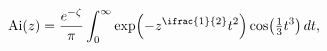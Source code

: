 \[\mathop{\mathrm{Ai}\/}\nolimits\!\left(z\right)=\frac{e^{-\zeta}}{\pi}\int_{0}%
^{\infty}\mathop{\exp\/}\nolimits\!\left(-z^{\ifrac{1}{2}}t^{2}\right)\mathop{%
\cos\/}\nolimits\!\left(\tfrac{1}{3}t^{3}\right)dt,\]